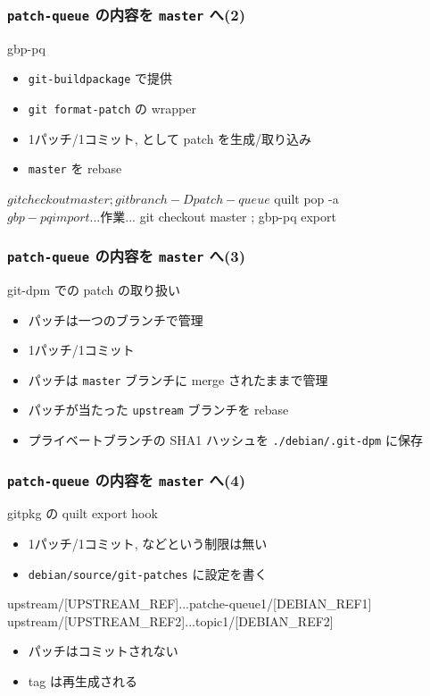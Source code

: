 \documentclass[10pt,final,c,dvipdfmx,cjk,colorlinks=false]{beamer}
\begin{document}
\begin{frame}
\frametitle{\texttt{patch-queue} の内容を \texttt{master} へ(2)}
\label{sec-4-7}
\begin{block}{gbp-pq}
\label{sec-4-7-1}

\begin{itemize}
\item \texttt{git-buildpackage} で提供
\item \texttt{git format-patch} の wrapper
\item 1パッチ/1コミット, として patch を生成/取り込み
\item \texttt{master} を rebase
\end{itemize}
\end{block}
\label{sec-4-7-2}

\begin{commandline}
$ git checkout master ; git branch -D patch-queue
$ quilt pop -a
$ gbp-pq import
 ... 作業 ...
$ git checkout master ; gbp-pq export
\end{commandline}
\end{frame}
\begin{frame}
\frametitle{\texttt{patch-queue} の内容を \texttt{master} へ(3)}
\label{sec-4-8}
\begin{block}{git-dpm での patch の取り扱い}
\label{sec-4-8-1}

\begin{itemize}
\item パッチは一つのブランチで管理
\item 1パッチ/1コミット
\item パッチは \texttt{master} ブランチに merge されたままで管理
\item パッチが当たった \texttt{upstream} ブランチを rebase
\item プライベートブランチの SHA1 ハッシュを
      \texttt{./debian/.git-dpm} に保存
\end{itemize}
\end{block}
\end{frame}
\begin{frame}
\frametitle{\texttt{patch-queue} の内容を \texttt{master} へ(4)}
\label{sec-4-9}
\begin{block}{gitpkg の quilt export hook}
\label{sec-4-9-1}

\begin{itemize}
\item 1パッチ/1コミット, などという制限は無い
\item \texttt{debian/source/git-patches} に設定を書く
\end{itemize}
    \begin{commandline}
    upstream/[UPSTREAM_REF]...patche-queue1/[DEBIAN_REF1]
    upstream/[UPSTREAM_REF2]...topic1/[DEBIAN_REF2]
    \end{commandline}
\begin{itemize}
\item パッチはコミットされない
\item tag は再生成される
\end{itemize}
\end{block}
\end{frame}
\end{document}
